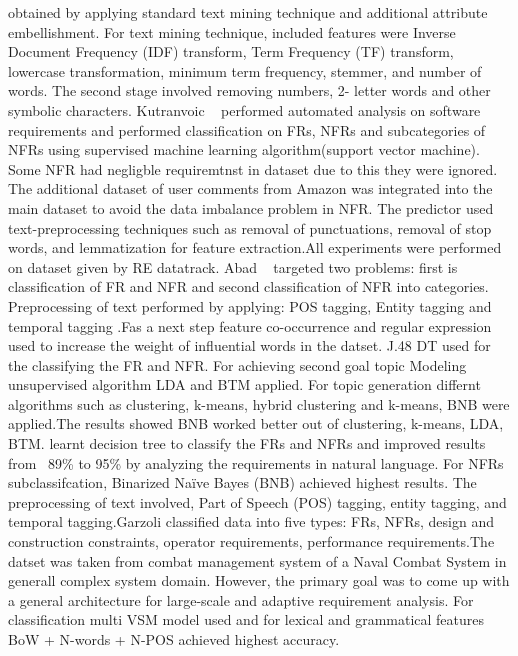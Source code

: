 obtained by applying standard text mining technique and additional attribute
embellishment. For text mining technique, included features were Inverse
Document Frequency (IDF) transform, Term Frequency (TF) transform, lowercase
transformation, minimum term frequency, stemmer, and number of words. The second
stage involved removing numbers, 2- letter words and other symbolic characters.
Kutranvoic \etal ~ \cite {Kurtanovic:2017}performed automated analysis on
software requirements and performed classification on FRs, NFRs and
subcategories of NFRs using supervised machine learning algorithm(support vector
machine). Some NFR had negligble requiremtnst in dataset due to this they were
ignored. The additional dataset of user comments from Amazon was integrated into
the main dataset to avoid the data imbalance problem in NFR. The predictor used
text-preprocessing techniques such as removal of punctuations, removal of stop
words, and lemmatization for feature extraction.All experiments were performed
on dataset given by RE datatrack.
 Abad \etal ~ \cite{Abad:2017} targeted two problems: first is classification of 
 FR and NFR and second classification of NFR into categories. Preprocessing of
 text performed by applying: POS tagging, Entity tagging and temporal tagging
 .Fas a next step feature co-occurrence and regular expression used to increase
 the weight of influential words in the datset. J.48 DT used for the classifying
 the FR and NFR. For achieving second goal topic Modeling unsupervised algorithm
 LDA and BTM applied. For topic generation differnt algorithms such as
 clustering, k-means, hybrid clustering and k-means, BNB were applied.The
 results showed BNB worked better out of clustering, k-means, LDA, BTM.
learnt decision tree to classify the FRs and NFRs and improved results from
~89\% to 95\% by analyzing the requirements in natural language. For NFRs
subclassifcation, Binarized Naïve Bayes (BNB) achieved highest results. The
preprocessing of text involved, Part of Speech (POS) tagging, entity tagging,
and temporal tagging.Garzoli \cite {Garzoli:2013} classified data into five
types: FRs, NFRs, design and construction constraints, operator requirements,
performance requirements.The datset was taken from combat management system of a
Naval Combat System in generall complex system domain. However, the primary goal
was to come up with a general architecture for large-scale and adaptive
requirement analysis. For classification multi VSM model used and for lexical
and grammatical features BoW + N-words + N-POS achieved highest accuracy.\\

